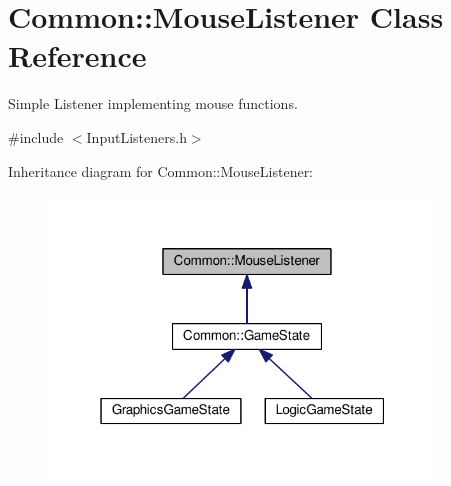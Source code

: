\hypertarget{class_common_1_1_mouse_listener}{}\section{Common\+:\+:Mouse\+Listener Class Reference}
\label{class_common_1_1_mouse_listener}


Simple Listener implementing mouse functions.  




{\ttfamily \#include $<$Input\+Listeners.\+h$>$}



Inheritance diagram for Common\+:\+:Mouse\+Listener\+:\nopagebreak
\begin{figure}[H]
\begin{center}
\leavevmode
\includegraphics[width=292pt]{class_common_1_1_mouse_listener__inherit__graph}
\end{center}
\end{figure}
